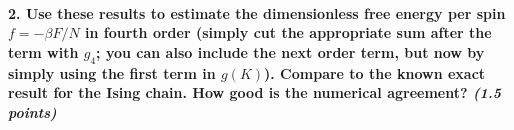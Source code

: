 \paragraph{2. Use these results to estimate 
    the dimensionless free energy per spin 
    $f=-\beta F/N$ in fourth order (simply cut 
    the appropriate sum after the term with 
    $g_4$; you can also include the next order
    term, but now by simply using the first 
    term in $g(K)$). Compare to the known 
    exact result for the Ising chain. How good
    is the numerical agreement?
    \textit{(1.5 points)}
}
